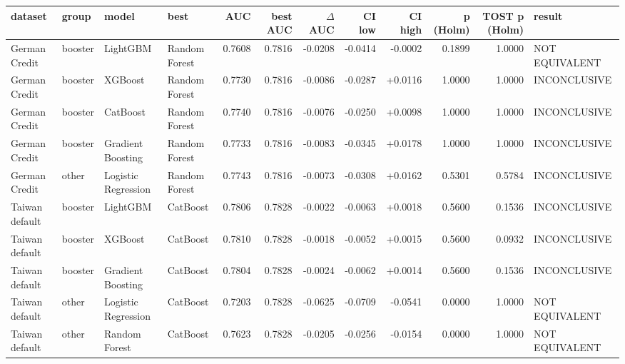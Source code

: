 \begin{tabular}{llllrrrrrrrl}
\toprule
dataset & group & model & best & AUC & best AUC & $\Delta$ AUC & CI low & CI high & p (Holm) & TOST p (Holm) & result \\
\midrule
German Credit & booster & LightGBM & Random Forest & 0.7608 & 0.7816 & -0.0208 & -0.0414 & -0.0002 & 0.1899 & 1.0000 & NOT EQUIVALENT \\
German Credit & booster & XGBoost & Random Forest & 0.7730 & 0.7816 & -0.0086 & -0.0287 & +0.0116 & 1.0000 & 1.0000 & INCONCLUSIVE \\
German Credit & booster & CatBoost & Random Forest & 0.7740 & 0.7816 & -0.0076 & -0.0250 & +0.0098 & 1.0000 & 1.0000 & INCONCLUSIVE \\
German Credit & booster & Gradient Boosting & Random Forest & 0.7733 & 0.7816 & -0.0083 & -0.0345 & +0.0178 & 1.0000 & 1.0000 & INCONCLUSIVE \\
German Credit & other & Logistic Regression & Random Forest & 0.7743 & 0.7816 & -0.0073 & -0.0308 & +0.0162 & 0.5301 & 0.5784 & INCONCLUSIVE \\
Taiwan default & booster & LightGBM & CatBoost & 0.7806 & 0.7828 & -0.0022 & -0.0063 & +0.0018 & 0.5600 & 0.1536 & INCONCLUSIVE \\
Taiwan default & booster & XGBoost & CatBoost & 0.7810 & 0.7828 & -0.0018 & -0.0052 & +0.0015 & 0.5600 & 0.0932 & INCONCLUSIVE \\
Taiwan default & booster & Gradient Boosting & CatBoost & 0.7804 & 0.7828 & -0.0024 & -0.0062 & +0.0014 & 0.5600 & 0.1536 & INCONCLUSIVE \\
Taiwan default & other & Logistic Regression & CatBoost & 0.7203 & 0.7828 & -0.0625 & -0.0709 & -0.0541 & 0.0000 & 1.0000 & NOT EQUIVALENT \\
Taiwan default & other & Random Forest & CatBoost & 0.7623 & 0.7828 & -0.0205 & -0.0256 & -0.0154 & 0.0000 & 1.0000 & NOT EQUIVALENT \\
\bottomrule
\end{tabular}
